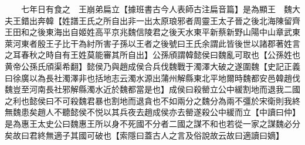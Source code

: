 　　七年日有食之　王崩弟扁立【據班書古今人表師古注扁音篇】是為顯王　魏大夫王錯出奔韓【姓譜王氏之所自出非一出太原琅邪者周靈王太子晉之後北海陳留齊王田和之後東海出自姬姓高平京兆魏信陵君之後天水東平新蔡新野山陽中山章武東萊河東者殷王子比干為紂所害子孫以王者之後號曰王氏余謂此皆後世以諸郡著姓言之耳春秋之時自有王姓莫能審其所自出】公孫頎謂韓懿侯曰魏亂可取也【公孫姓也黄帝公孫氏頎渠希翻】懿侯乃與趙成侯合兵伐魏戰于濁澤大破之遂圍魏【史記正義曰徐廣以為長社濁澤非也括地志云濁水源出蒲州解縣東北平地爾時魏都安邑韓趙伐魏豈至河南長社邪解縣濁水近於魏都當是也】成侯曰殺罃立公中緩割地而退我二國之利也懿侯曰不可殺魏君暴也割地而退貪也不如兩分之魏分為兩不彊於宋衛則我終無魏患矣趙人不聽懿侯不悦以其兵夜去趙成侯亦去罃遂殺公中緩而立【中讀曰仲】是為惠王太史公曰魏惠王所以身不死國不分者二國之謀不和也若從一家之謀魏必分矣故曰君終無適子其國可破也【索隱曰蓋古人之言及俗說故云故曰適讀曰嫡】